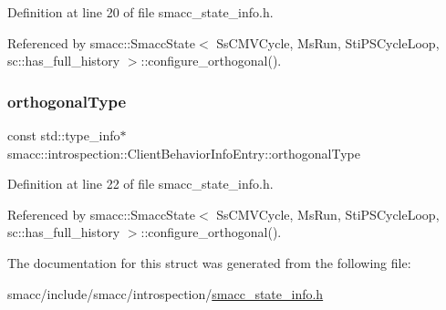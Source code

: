 Definition at line 20 of file smacc\+\_\+state\+\_\+info.\+h.



Referenced by smacc\+::\+Smacc\+State$<$ Ss\+C\+M\+V\+Cycle, Ms\+Run, Sti\+P\+S\+Cycle\+Loop, sc\+::has\+\_\+full\+\_\+history $>$\+::configure\+\_\+orthogonal().

\mbox{\label{structsmacc_1_1introspection_1_1ClientBehaviorInfoEntry_aabffb57e6ee723ce1b2bdb6ad30c6993}} 
\subsubsection{\texorpdfstring{orthogonal\+Type}{orthogonalType}}
{\footnotesize\ttfamily const std\+::type\+\_\+info$\ast$ smacc\+::introspection\+::\+Client\+Behavior\+Info\+Entry\+::orthogonal\+Type}



Definition at line 22 of file smacc\+\_\+state\+\_\+info.\+h.



Referenced by smacc\+::\+Smacc\+State$<$ Ss\+C\+M\+V\+Cycle, Ms\+Run, Sti\+P\+S\+Cycle\+Loop, sc\+::has\+\_\+full\+\_\+history $>$\+::configure\+\_\+orthogonal().



The documentation for this struct was generated from the following file\+:\begin{DoxyCompactItemize}
\item 
smacc/include/smacc/introspection/\hyperlink{smacc__state__info_8h}{smacc\+\_\+state\+\_\+info.\+h}\end{DoxyCompactItemize}
